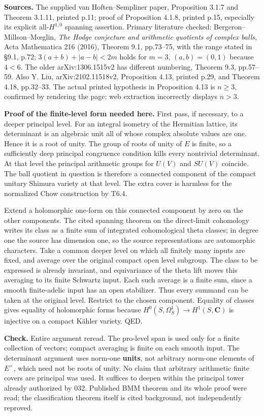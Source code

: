 \textbf{Sources.} The supplied van Hoften--Sempliner paper, Proposition 3.1.7 and Theorem 3.1.11, printed p.11; proof of Proposition 4.1.8, printed p.15, especially its explicit all-\(H^{1,0}\) spanning assertion. Primary literature checked: Bergeron--Millson--Mœglin, \emph{The Hodge conjecture and arithmetic quotients of complex balls}, Acta Mathematica 216 (2016), Theorem 9.1, pp.73--75, with the range stated in §9.1, p.72; \(3(a+b)+|a-b|<2m\) holds for \(m=3\), \((a,b)=(0,1)\) because \(4<6\). The older arXiv:1306.1515v2 has different numbering, Theorem 9.3, pp.57--59. Also Y. Liu, arXiv:2102.11518v2, Proposition 4.13, printed p.29, and Theorem 4.18, pp.32--33. The actual printed hypothesis in Proposition 4.13 is \(n\ge3\), confirmed by rendering the page: web extraction incorrectly displays \(n>3\).

\textbf{Proof of the finite-level form needed here.} First pass, if necessary, to a deeper principal level. For an integral isometry of the Hermitian lattice, its determinant is an algebraic unit all of whose complex absolute values are one. Hence it is a root of unity. The group of roots of unity of \(E\) is finite, so a sufficiently deep principal congruence condition kills every nontrivial determinant. At that level the principal arithmetic groups for \(U(V)\) and \(SU(V)\) coincide. The ball quotient in question is therefore a connected component of the compact unitary Shimura variety at that level. The extra cover is harmless for the normalized Chow construction by T6.4.

Extend a holomorphic one-form on this connected component by zero on the other components. The cited spanning theorem on the direct-limit cohomology writes its class as a finite sum of integrated cohomological theta classes; in degree one the source has dimension one, so the source representations are automorphic characters. Take a common deeper level on which all finitely many inputs are fixed, and average over the original compact open level subgroup. The class to be expressed is already invariant, and equivariance of the theta lift moves this averaging to its finite Schwartz input. Each such average is a finite sum, since a smooth finite-adelic input has an open stabilizer. Thus every summand can be taken at the original level. Restrict to the chosen component. Equality of classes gives equality of holomorphic forms because \(H^0(S,\Omega^1_S)\to H^1(S,\mathbf C)\) is injective on a compact Kähler variety. QED.

\textbf{Check.} Entire argument reread. The pro-level span is used only for a finite collection of vectors; compact averaging is finite on each smooth input. The determinant argument uses norm-one \textbf{units}, not arbitrary norm-one elements of \(E^\times\), which need not be roots of unity. No claim that arbitrary arithmetic finite covers are principal was used. It suffices to deepen within the principal tower already authorized by 032. Published BMM theorem and its whole proof were read; the classification theorem itself is cited background, not independently reproved.

